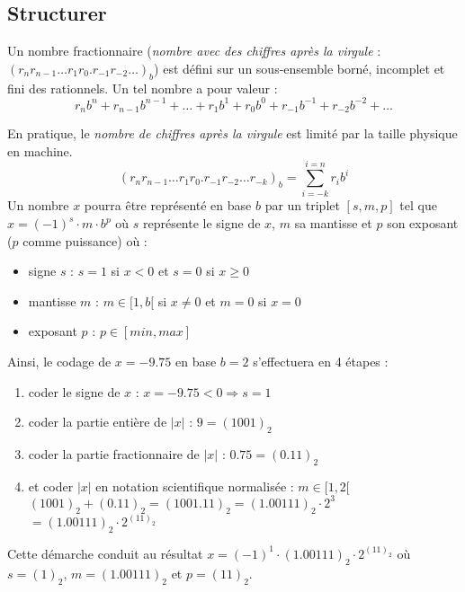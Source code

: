 \subsection{Structurer}
\begin{ex}\label{ex:fraction}
Un nombre fractionnaire ({\em nombre avec des chiffres après la virgule} :
{$(r_nr_{n-1}\ldots r_1r_0.r_{-1}r_{-2}\ldots)_b$})
est défini sur un sous-en\-semble borné, incomplet et fini des rationnels.
Un tel nombre a pour valeur :
$${r_nb^n + r_{n-1}b^{n-1} + \ldots + r_1b^1 + r_0b^0 + r_{-1}b^{-1} + r_{-2}b^{-2} + \ldots}$$

En pratique, le {\em nombre de chiffres après la virgule} est limité par la taille physique
en machine.
$${(r_nr_{n-1}\ldots r_1r_0.r_{-1}r_{-2}\ldots r_{-k})_b = \sum_{i=-k}^{i=n} r_ib^i}$$
Un nombre $x$ pourra être représenté en base $b$ par un triplet
$[s,m,p]$ tel que ${x = (-1)^s \cdot m \cdot b^p}$ où $s$ représente le signe de $x$,
$m$ sa mantisse et $p$ son exposant ($p$ comme puissance) où :
\begin{itemize}
\item signe $s$ : $s = 1$ si $x < 0$ et $s = 0$ si $x \geq 0$
\item mantisse $m$ : $m \in [1,b[$ si $x \neq 0$ et $m = 0$ si $x = 0$
\item exposant $p$ : $p \in [min,max]$
\end{itemize}
\end{ex}
\noindent Ainsi, le codage de $x = -9.75$ en base $b = 2$ s'effectuera en 4
étapes :
\begin{enumerate}
\item coder le signe de $x$ : $x = -9.75 < 0 \Rightarrow {s = 1}$
\item coder la partie entière de $|x|$ : {$9 = (1001)_2$}
\item coder la partie fractionnaire de $|x|$ : {$0.75 = (0.11)_2$}
\item et coder $|x|$ en notation scientifique normalisée : $m \in [1,2[$\\
	$(1001)_2 + (0.11)_2 = (1001.11)_2 = (1.00111)_2\cdot 2^{3}$\\ 
	$= {(1.00111)_2\cdot 2^{{(11)}_2}}$
\end{enumerate}
Cette démarche conduit au résultat $x = (-1)^{1} \cdot (1.00111)_2 \cdot 2^{(11)_2}$ où
$s = (1)_2$, $m = (1.00111)_2$  et $p = (11)_2$.

